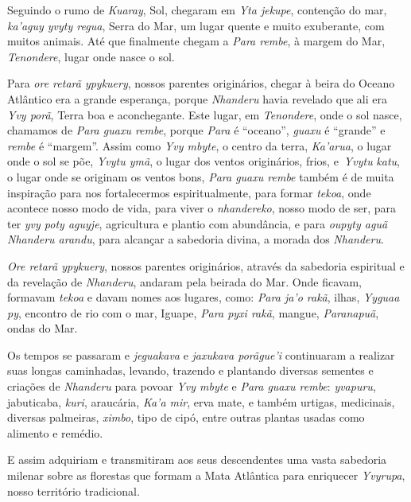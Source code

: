 Seguindo o rumo de \emph{Kuaray}, Sol, chegaram em \emph{Yta jekupe},
contenção do mar, \emph{ka'aguy yvyty regua}, Serra do Mar, um lugar
quente e muito exuberante, com muitos animais. Até que finalmente chegam
a \emph{Para rembe}, à margem do Mar, \emph{Tenondere}, lugar onde nasce
o sol.


 

Para \emph{ore retarã ypykuery}, nossos parentes originários, chegar à
beira do Oceano Atlântico era a grande esperança, porque \emph{Nhanderu}
havia revelado que ali era \emph{Yvy porã}, Terra boa e aconchegante.
Este lugar, em \emph{Tenondere}, onde o sol nasce, chamamos de
\emph{Para guaxu rembe}, porque \emph{Para} é ``oceano'', \emph{guaxu} é
``grande'' e \emph{rembe} é ``margem''. Assim como \emph{Yvy mbyte}, o
centro da terra, \emph{Ka'arua}, o lugar onde o sol se põe, \emph{Yvytu
ymã}, o lugar dos ventos originários, frios, e~\emph{Yvytu} \emph{katu},
o lugar onde se originam os ventos bons, \emph{Para guaxu rembe} também
é de muita inspiração para nos fortalecermos espiritualmente, para
formar \emph{tekoa}, onde acontece nosso modo de vida, para viver o
\emph{nhandereko}, nosso modo de ser, para ter \emph{yvy poty aguyje},
agricultura e plantio com abundância, e para \emph{oupyty aguã Nhanderu
arandu}, para alcançar a sabedoria divina, a morada dos \emph{Nhanderu}.

\emph{Ore retarã ypykuery}, nossos parentes originários, através da
sabedoria espiritual e da revelação de \emph{Nhanderu}, andaram pela
beirada do Mar. Onde ficavam, formavam \emph{tekoa} e davam nomes aos
lugares, como: \emph{Para ja'o rakã}, ilhas, \emph{Yyguaa py}, encontro
de rio com o mar, Iguape, \emph{Para pyxi rakã}, mangue,
\emph{Paranapuã}, ondas do Mar.


 

Os tempos se passaram e \emph{jeguakava} e \emph{jaxukava porãgue'i}
continuaram a realizar suas longas caminhadas, levando, trazendo e
plantando diversas sementes e criações de \emph{Nhanderu} para povoar
\emph{Yvy mbyte} e \emph{Para guaxu rembe}: \emph{yvapuru}, jabuticaba,
\emph{kuri}, araucária, \emph{Ka'a mir}, erva mate, e também urtigas,
medicinais, diversas palmeiras, \emph{ximbo}, tipo de cipó, entre outras
plantas usadas como alimento e remédio.

E assim adquiriam e transmitiram aos seus descendentes uma vasta
sabedoria milenar sobre as florestas que formam a Mata Atlântica para
enriquecer \emph{Yvyrupa}, nosso território tradicional.

